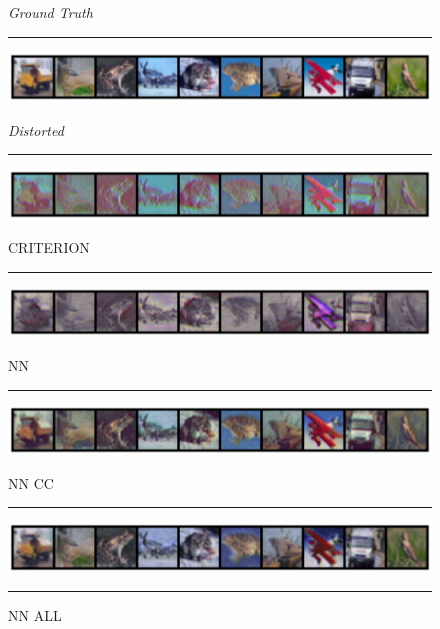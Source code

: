 \begin{figure}
    \centering
    \setlength{\abovecaptionskip}{0pt plus 0pt minus 0pt}
    \setlength{\belowcaptionskip}{16pt plus 0pt minus 0pt}
    \caption*{\normalsize{\textit{Ground Truth}}}
    \rule{0.4\textwidth}{.4pt}
    
    \centerline{\hspace*{8mm}\includegraphics[width=1.4\textwidth]{figures/reconstruction_CIFAR10_ground_truth.png}}
    \caption*{\normalsize{\textit{Distorted}}}
    \rule{0.4\textwidth}{.4pt}
    
    \centerline{\hspace*{8mm}\includegraphics[width=1.4\textwidth]{figures/reconstruction_CIFAR10_distorted.png}}
    \caption*{\normalsize{CRITERION}}
    \rule{0.4\textwidth}{.4pt}
    
    \centerline{\hspace*{8mm}\includegraphics[width=1.4\textwidth]{figures/reconstruction_CIFAR10_CRITERION_epoch_100.png}}
    \caption*{\normalsize{NN}}
    \rule{0.4\textwidth}{.4pt}
    
    \centerline{\hspace*{8mm}\includegraphics[width=1.4\textwidth]{figures/reconstruction_CIFAR10_NN_epoch_100.png}}
    \caption*{\normalsize{NN CC}}
    \rule{0.4\textwidth}{.4pt}
    
    \centerline{\hspace*{8mm}\includegraphics[width=1.4\textwidth]{figures/reconstruction_CIFAR10_NN_CC_epoch_100.png}}
    \caption*{\normalsize{NN ALL}}
    \rule{0.4\textwidth}{.4pt}
    

\end{figure}
